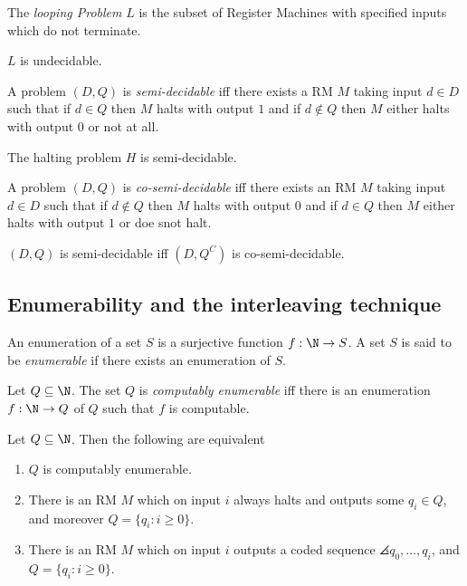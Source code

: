 \documentclass{article}
\begin{document}
\begin{definition*}[Looping]
	The \emph{looping Problem} $L$ is the subset of Register Machines with specified
	inputs which do not terminate.
\end{definition*}

\begin{theorem*}
	$L$ is undecidable.
\end{theorem*}

\begin{definition*}
	A problem $(D,Q)$ is \emph{semi-decidable} iff there exists a RM $M$ taking
	input $d\in D$ such that if $d\in Q$ then $M$ halts with output $1$ and if
	$d\not\in Q$ then $M$ either halts with output $0$ or not at all.
\end{definition*}

\begin{corollary*}
	The halting problem $H$ is semi-decidable.
\end{corollary*}

\begin{definition*}
	A problem $(D,Q)$ is \emph{co-semi-decidable} iff there exists an RM $M$
	taking input $d\in D$ such that if $d\not\in Q$ then $M$ halts with output
	$0$ and if $d\in Q$ then $M$ either halts with output $1$ or doe snot halt.
\end{definition*}

\begin{theorem*}
	$(D,Q)$ is semi-decidable iff $(D, Q^C)$ is co-semi-decidable.
\end{theorem*}

\subsection{Enumerability and the interleaving technique}

\begin{definition*}[Enumerability]
	An enumeration of a set $S$ is a surjective function $f:\N\to S$. A set $S$
	is said to be \emph{enumerable} if there exists an enumeration of $S$.
\end{definition*}

\begin{definition*}
	Let $Q\subseteq\N$. The set $Q$ is \emph{computably enumerable} iff there is
	an enumeration $f:\N\to Q$ of $Q$ such that $f$ is computable.
\end{definition*}

\begin{theorem*}
	Let $Q\subseteq\N$. Then the following are equivalent
	\begin{enumerate}
		\item $Q$ is computably enumerable.
		\item There is an RM $M$ which on input $i$ always halts and outputs some $q_i\in Q$,
		      and moreover $Q=\{q_i : i\geq 0\}$.
		\item There is an RM $M$ which on input $i$ outputs a coded sequence $\angles{q_0,...,q_i}$,
		      and $Q=\{q_i:i\geq 0\}$.
	\end{enumerate}
\end{theorem*}
\end{document}
